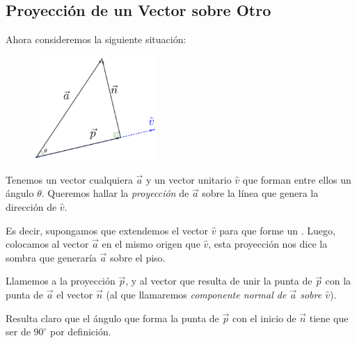 \documentclass[12pt, fleqn]{report}                             %
\newcommand \Quote {\qq}                                        %
\theoremstyle{break}                                            %
\begin{document}
            \clearpage
            \subsection{Proyección de un Vector sobre Otro}
            
                Ahora consideremos la siguiente situación:

                \begin{figure}
                    \centering
                    \includegraphics[width=0.42\textwidth]{vectorProyection}
                \end{figure}

                Tenemos un vector cualquiera $\vec{a}$ y un vector unitario $\hat{v}$ que forman
                entre ellos un ángulo $\theta$.
                Queremos hallar la \emph{proyección} de $\vec{a}$ sobre la línea que genera la
                dirección de $\hat{v}$.
                
                Es decir, supongamos que extendemos el vector $\hat{v}$ para que forme un \Quote{piso}.
                Luego, colocamos al vector $\vec{a}$ en el mismo origen que $\hat{v}$, esta proyección
                nos dice la sombra que generaría $\vec{a}$ sobre el piso.
                
                Llamemos a la proyección $\vec{p}$, y al vector que resulta de unir la punta de $\vec{p}$
                con la punta de $\vec{a}$ el vector $\vec{n}$ (al que llamaremos \emph{componente normal
                de $\vec{a}$ sobre $\hat{v}$}).
                
                Resulta claro que el ángulo que forma la punta de $\vec{p}$ con el inicio de $\vec{n}$
                tiene que ser de $90^\circ$ por definición.
\end{document}
